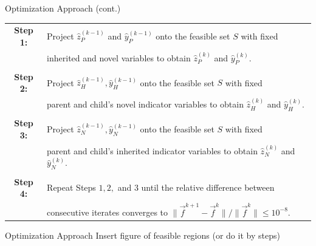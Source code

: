 \documentclass[10pt, t]{beamer}
\begin{document}
\begin{frame}{Optimization Approach}
	(cont.)\\
	\medskip
	\begin{tabular}{c l}
		\textbf{Step 1:}  & Project $\hat{z}_P^{(k-1)}$ and $\hat{y}_P^{(k-1)}$ onto the feasible set $S$ with fixed \\
								   &  inherited and novel variables to obtain  $\hat{z}_P^{(k)}$ and $\hat{y}_P^{(k)}$.\\
								   & \phantom{ }\\ \pause
		\textbf{Step 2:} & Project $\hat{z}_H^{(k-1)}, \hat{y}_H^{(k-1)}$ onto the feasible set $S$ with fixed \\
								   &  parent and child's novel indicator variables to obtain  $\hat{z}_H^{(k)}$ and $\hat{y}_H^{(k)}$.\\
								   & \phantom{ }\\ \pause
		\textbf{Step 3:} & Project $\hat{z}_N^{(k-1)}, \hat{y}_N^{(k-1)}$ onto the feasible set $S$ with fixed \\
								   & parent and child's inherited indicator variables to obtain  $\hat{z}_N^{(k)}$ and $\hat{y}_N^{(k)}$.\\
								   & \phantom{ }\\ \pause
		\textbf{Step 4:} & Repeat Steps $1, 2,$ and $3$ until the relative difference between \\
								   & consecutive iterates converges to $\|\vec{f}^{k+1} - \vec{f}^{k}\|/\|\vec{f}^{k}\| \leq 10^{-8}$.				
	\end{tabular}
	
\end{frame}

\begin{frame}{Optimization Approach}
Insert figure of feasible regions (or do it by steps)
\end{frame}
\end{document}
